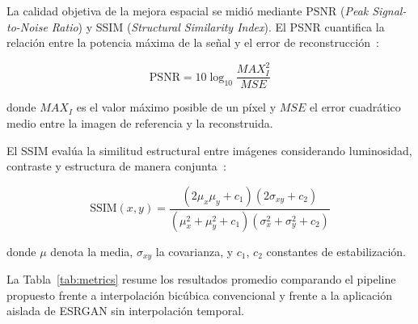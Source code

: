 \documentclass[conference]{IEEEtran}
\begin{document}
La calidad objetiva de la mejora espacial se midió mediante PSNR (\textit{Peak Signal-to-Noise Ratio}) y SSIM (\textit{Structural Similarity Index}). El PSNR cuantifica la relación entre la potencia máxima de la señal y el error de reconstrucción~\cite{huynhthu2008psnr}:

\begin{equation}
    \mathrm{PSNR} = 10\log_{10}\frac{MAX_I^{2}}{MSE}
    \label{eq:psnr}
\end{equation}

\noindent donde $MAX_I$ es el valor máximo posible de un píxel y $MSE$ el error cuadrático medio entre la imagen de referencia y la reconstruida.

El SSIM evalúa la similitud estructural entre imágenes considerando luminosidad, contraste y estructura de manera conjunta~\cite{wang2004ssim}:

\begin{equation}
    \mathrm{SSIM}(x,y) =
        \frac{(2\mu_x\mu_y + c_1)(2\sigma_{xy} + c_2)}
             {(\mu_x^2 + \mu_y^2 + c_1)(\sigma_x^2 + \sigma_y^2 + c_2)}
    \label{eq:ssim}
\end{equation}

\noindent donde $\mu$ denota la media, $\sigma_{xy}$ la covarianza, y $c_1$, $c_2$ constantes de estabilización.

La Tabla~\ref{tab:metrics} resume los resultados promedio comparando el pipeline propuesto frente a interpolación bicúbica convencional y frente a la aplicación aislada de ESRGAN sin interpolación temporal.

\begin{table}[t]
    \caption{Comparación de Métricas de Calidad Objetiva}
    \label{tab:metrics}
    \renewcommand{\arraystretch}{1.2}
    \centering
\end{table}
\end{document}

